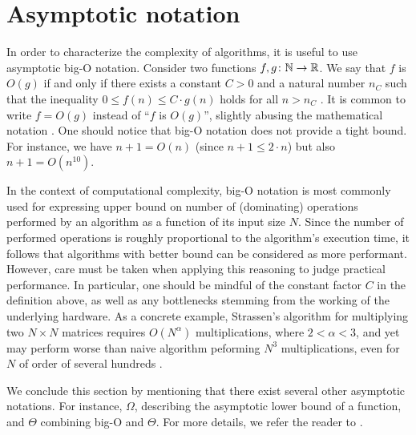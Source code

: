 \chapter{Asymptotic notation}

In order to characterize the complexity of algorithms, it is useful to use
asymptotic big-O notation. Consider two functions $f, g \colon \mathbb{N} \to \mathbb{R}$. We
say that $f$ is $O(g)$ if and only if there exists a constant $C > 0$ and a
natural number $n_{C}$ such that the inequality $0 \le f(n) \le C\cdot g(n)$
holds for all $n > n_{C}$ \cite{clrs}. It is common to write $f=O(g)$ instead
of ``$f$ is $O(g)$'', slightly abusing the mathematical notation \cite{clrs}.
One should notice that big-O notation does not provide a tight bound. For
instance, we have $n + 1 = O(n)$ (since $n + 1 \le 2 \cdot n$) but also $n+1 =
  O(n^{10})$.

In the context of computational complexity, big-O notation is most commonly
used for expressing upper bound on number of (dominating) operations performed
by an algorithm as a function of its input size $N$. Since the number of
performed operations is roughly proportional to the algorithm's execution time,
it follows that algorithms with better bound can be considered as more
performant. However, care must be taken when applying this reasoning to judge
practical performance. In particular, one should be mindful of the constant
factor $C$ in the definition above, as well as any bottlenecks stemming from
the working of the underlying hardware. As a concrete example, Strassen's
algorithm for multiplying two $N \times N$ matrices requires $O(N^{\alpha})$
multiplications, where $2 < \alpha < 3$, and yet may perform worse than naive
algorithm peforming $N^{3}$ multiplications, even for $N$ of order of several
hundreds \cite{dalberto}.

We conclude this section by mentioning that there exist several other
asymptotic notations. For instance, $\Omega$, describing the asymptotic lower bound
of a function, and $\Theta$ combining big-O and $\Theta$. For more details, we
refer the reader to \cite{clrs}.

